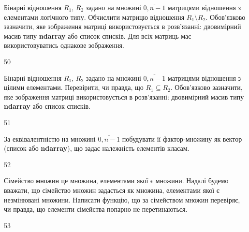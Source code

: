 Бінарні відношення $R_1$, $R_2$ задано на множині $\overline{0,n-1}$ матрицями відношення з елементами логічного типу. Обчислити матрицю відношення $R_1\setminus R_2$. Обов'язково зазначити, яке зображення матриці використовується в розв'язанні: двовимірний масив типу \textbf{ndarray} або список списків. Для всіх матриць має використовуватись однакове зображення.
\\\par
50 














Бінарні відношення $R_1$, $R_2$ задано на множині $\overline{0,n-1}$ матрицями відношення з цілими елементами. Перевірити, чи правда, що  $R_1\subseteq R_2$. Обов'язково зазначити, яке зображення матриці використовується в розв'язанні: двовимірний масив типу \textbf{ndarray} або список списків.
\\\par
51 














За еквівалентністю на множині $\overline{0,n-1}$ побудувати її фактор-множину як вектор (список або  \textbf{ndarray}), що задає належність елементів класам.
\\\par
52 














Сімейство множин це множина, елементами якої є множини. Надалі будемо вважати, що сімейство множин задається як множина, елементами якої є незмінювані множини. Написати функцію, що за сімейством множин перевіряє, чи правда, що елементи сімейства попарно не перетинаються.
\\\par
53 














